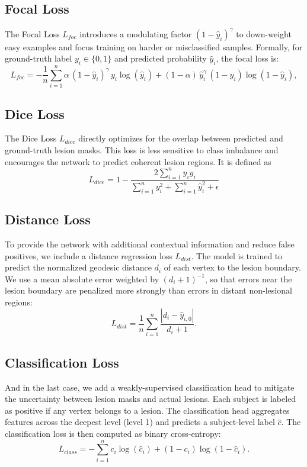 \documentclass[FCD_GNN.tex]{subfiles}
\begin{document}
\subsection{Focal Loss}
The Focal Loss $L_{foc}$ introduces a modulating factor $(1-\hat{y}_i)^\gamma$ to down-weight easy examples and focus training on harder or misclassified samples. Formally, for ground-truth label $y_i \in \{0,1\}$ and predicted probability $\hat{y}_i$, the focal loss is:
\[
L_{foc} = - \frac{1}{n} \sum_{i=1}^{n} \alpha \, (1-\hat{y}_i)^\gamma \, y_i \log(\hat{y}_i) + (1-\alpha) \, \hat{y}_i^\gamma \, (1-y_i) \log(1-\hat{y}_i),
\]

\subsection{Dice Loss}
The Dice Loss $L_{dice}$ directly optimizes for the overlap between predicted and ground-truth lesion masks. This loss is less sensitive to class imbalance and encourages the network to predict coherent lesion regions. It is defined as
\[
L_{dice} = 1 - \frac{2 \sum_{i=1}^n y_i \hat{y}_i}{\sum_{i=1}^n y_i^2 + \sum_{i=1}^n \hat{y}_i^2 + \epsilon}
\]

\subsection{Distance Loss}
To provide the network with additional contextual information and reduce false positives, we include a distance regression loss $L_{dist}$. The model is trained to predict the normalized geodesic distance $d_i$ of each vertex to the lesion boundary. We use a mean absolute error weighted by $(d_i+1)^{-1}$, so that errors near the lesion boundary are penalized more strongly than errors in distant non-lesional regions:
\[
L_{dist} = \frac{1}{n} \sum_{i=1}^{n} \frac{|d_i - \hat{y}_{i,0}|}{d_i + 1}.
\]

\subsection{Classification Loss}
And in the last case, we add a weakly-supervised classification head to mitigate the uncertainty between lesion masks and actual lesions. Each subject is labeled as positive if any vertex belongs to a lesion. The classification head aggregates features across the deepest level (level 1) and predicts a subject-level label $\hat{c}$. The classification loss is then computed as binary cross-entropy:
\[
L_{class} = - \sum_{i=1}^{n} c_i \log(\hat{c}_i) + (1-c_i)\log(1-\hat{c}_i).
\]
\end{document}
